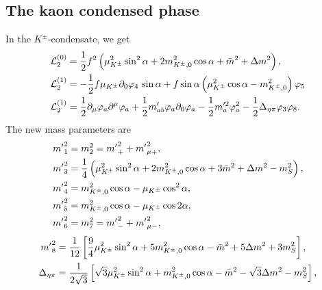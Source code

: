 \subsection{The kaon condensed phase}

In the $K^\pm$-condensate, we get
%
\begin{align}
    \label{static three-flavor Lagrangian kaon condensate}
    \mathcal{L}^{(0)}_2 
    & =
    \frac{1}{2}f^2 
    \left(
        \mu_{K^\pm}^2 \sin^2\alpha
        + 2m^2_{{K^\pm}, 0} \cos\alpha
        + \bar m^2 +\Delta m^2
    \right), \\
    \label{linear three-flavor Lagrangian kaon condensate}
    \mathcal{L}_2^{(1)}
    & 
    =
    - \frac{1}{2}f\mu_{K^\pm}\partial_0\varphi_4 \, \sin\alpha 
    + f\sin\alpha
    \left(
        \mu_{K^\pm}^2 \cos\alpha
        -m_{{K^\pm},0}^2
    \right)\varphi_5\\
    \label{quadratic three-flavor Lagrangian kaon condensate}
    \mathcal{L}_2^{(1)}
    & =
    \frac{1}{2} \partial_\mu \varphi_a \partial^\mu \varphi_a
    + \frac{1}{2}m'_{ab} \varphi_a\partial_0\varphi_a
    - \frac{1}{2}m'^2_{a} \varphi_a^2
    - \frac{1}{2}\Delta_{\eta\pi} \varphi_3\varphi_8.
\end{align}
%
The new mass parameters are
%
\begingroup
\allowdisplaybreaks
\begin{align}
    {m'}_1^2 & = m_2^2 = {m'}_+^2 + {m'}_{\mu+}^2,\\
    {m'}_3^2 
    & = 
    \frac{1}{4}
    \left(
        \mu_{K^\pm}^2 \sin^2\alpha
        + 2 m_{{K^\pm}, 0}^2\cos\alpha
        + 3\bar m^2
        + \Delta m^2
        - m_S^2
    \right),\\
    {m'}_4^2 & = m_{{K^\pm},0}^2\cos\alpha -\mu_{K^\pm} \cos^2\alpha, \\
    {m'}_5^2 & = m_{{K^\pm},0}^2\cos\alpha -\mu_{K^\pm} \cos 2\alpha, \\
    {m'}_6^2 & = m_7^2 = {m'}_-^2 + {m'}_{\mu-}^2,
\end{align}
\begin{align}
    {m'}_8^2
    & =
    \frac{1}{12}
    \left[
        \frac{9}{4}\mu_{{K^\pm}}^2\sin^2\alpha
        + 5 m_{{K^\pm},0}^2 \cos\alpha 
        - \bar m^2
        + 5\Delta m^2
        + 3 m_S^2
    \right], \\
    \Delta_{\eta\pi}
    & =
    \frac{1}{2\sqrt{3}}
    \left[
        \sqrt{3} \mu_{K^\pm}^2\sin^2\alpha
        + m_{{K^\pm},0}^2\cos\alpha 
        - \bar m^2
        - \sqrt{3} \Delta m^2
        - m^2_S
    \right],\\
\end{align}
